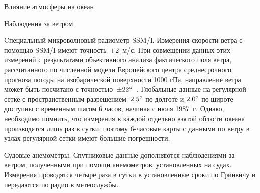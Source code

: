 \begin{chapter}{Влияние атмосферы на океан}
\begin{section}{Наблюдения за ветром}
\begin{paragraph}{Cпециальный микроволновый радиометр SSM/I.}
Измерения скорости ветра с помощью SSM/I имеют точность~$\pm 2$~м/с. При
совмещении данных этих измерений с результатами объективного анализа
фактического поля ветра, рассчитанного по численной модели
Европейского центра среднесрочного прогноза погоды на изобарической
поверхности 1000 гПа, направление ветра может быть посчитано с
точностью~$\pm {22}^\circ$~\cite{Atlas:1993}. 
Глобальные данные на регулярной сетке с пространственным 
разрешением~${2.5}^\circ$ по долготе и ${2.0}^\circ$ по широте 
доступны с временным шагом 6 часов, начиная с июля 1987~г.
Однако, необходимо помнить, что измерения в каждой отдельно взятой области 
океана производятся лишь раз в сутки, поэтому 6-часовые карты с данными 
по ветру в узлах регулярной сетки имеют большие погрешности.
%
\end{paragraph}

\begin{paragraph}{Судовые анемометры.}
Спутниковые данные дополняются наблюдениями за ветром, полученными при помощи
анемометров, установленных на судах. Измерения проводятся четыре раза
в сутки в установленные сроки по Гринвичу и передаются по радио в
метеослужбы.
%



\end{paragraph}
\end{section}
\end{chapter}
